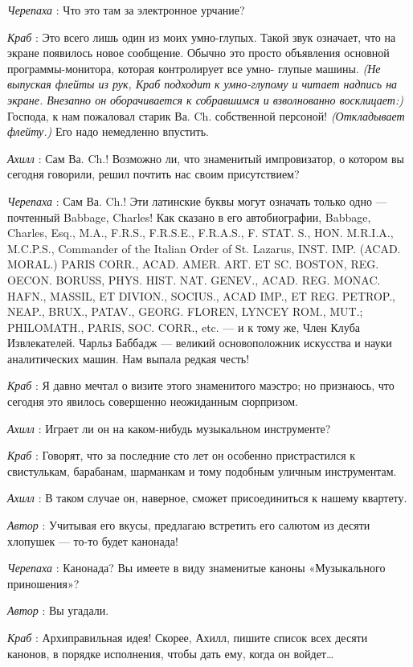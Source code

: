 \emph{Черепаха} : Что это там за электронное урчание?

\emph{Краб} : Это всего лишь один из моих умно-глупых. Такой звук означает, что на экране появилось новое сообщение. Обычно это просто объявления основной программы-монитора, которая контролирует все умно- глупые машины. \emph{(Не выпуская флейты из рук, Краб подходит к умно-глупому и читает надпись на экране. Внезапно он оборачивается к собравшимся и взволнованно восклицает:)} Господа, к нам пожаловал старик Ва. Ch. собственной персоной! \emph{(Откладывает флейту.)} Его надо немедленно впустить.

\emph{Ахилл} : Сам Ва. Ch.! Возможно ли, что знаменитый импровизатор, о котором вы сегодня говорили, решил почтить нас своим присутствием?

\emph{Черепаха} : Сам Ва. Ch.! Эти латинские буквы могут означать только одно --- почтенный Babbage, Charles! Как сказано в его автобиографии, Babbage, Charles, Esq., M.A., F.R.S., F.R.S.E., F.R.A.S., F. STAT. S., HON. M.R.I.A., M.C.P.S., Commander of the Italian Order of St. Lazarus, INST. IMP. (ACAD. MORAL.) PARIS CORR., ACAD. AMER. ART. ET SC. BOSTON, REG. OECON. BORUSS, PHYS. HIST. NAT. GENEV., ACAD. REG. MONAC. HAFN., MASSIL, ET DIVION., SOCIUS., ACAD IMP., ET REG. PETROP., NEAP., BRUX., PATAV., GEORG. FLOREN, LYNCEY ROM., MUT.; PHILOMATH., PARIS, SOC. CORR., etc. --- и к тому же, Член Клуба Извлекателей. Чарльз Баббадж --- великий основоположник искусства и науки аналитических машин. Нам выпала редкая честь!

\emph{Краб} : Я давно мечтал о визите этого знаменитого маэстро; но признаюсь, что сегодня это явилось совершенно неожиданным сюрпризом.

\emph{Ахилл} : Играет ли он на каком-нибудь музыкальном инструменте?

\emph{Краб} : Говорят, что за последние сто лет он особенно пристрастился к свистулькам, барабанам, шарманкам и тому подобным уличным инструментам.

\emph{Ахилл} : В таком случае он, наверное, сможет присоединиться к нашему квартету.

\emph{Автор} : Учитывая его вкусы, предлагаю встретить его салютом из десяти хлопушек --- то-то будет канонада!

\emph{Черепаха} : Канонада? Вы имеете в виду знаменитые каноны «Музыкального приношения»?

\emph{Автор} : Вы угадали.

\emph{Краб} : Архиправильная идея! Скорее, Ахилл, пишите список всех десяти канонов, в порядке исполнения, чтобы дать ему, когда он войдет\ldots{}


